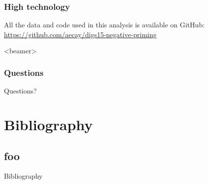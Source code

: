 \documentclass{digs-slides}
\begin{document}
\begin{frame}
    \frametitle{High technology}
    All the data and code used in this analysis is available on GitHub:
    \url{https://github.com/aecay/digs15-negative-priming}
\end{frame}

\begin{frame}<beamer>
    \frametitle{Questions}
    \begin{center}
        \Huge
        Questions?
    \end{center}
\end{frame}

\section{Bibliography}
\label{sec:bibliography}

\subsection*{foo}

\begin{frame}[allowframebreaks=0.9]{Bibliography}
    \printbibliography[heading=none]
\end{frame}

\end{document}
